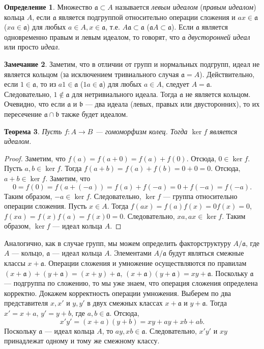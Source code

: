 \documentclass[12pt, titlepage, oneside]{amsbook}
\newcommand{\aaa}{\mathfrak{a}}
\newcommand{\bbb}{\mathfrak{b}}
\newtheorem{theorem}{Теорема}[chapter]
\theoremstyle{definition}
\newtheorem{definition}[theorem]{Определение}
\newtheorem{remark}[theorem]{Замечание}
\theoremstyle{remark}
\begin{document}
\begin{definition}
	Множество $\aaa\subset A$ называется \emph{левым идеалом} (\emph{правым идеалом}) кольца $A$, если $\aaa$ является подгруппой относительно операции сложения и $ax\in\aaa$ ($xa\in\aaa$) для любых $a\in A, x\in\aaa$, т.е. $A\aaa\subset\aaa$ ($\aaa A\subset\aaa$). Если $\aaa$ является одновременно правым и левым идеалом, то говорят, что $\aaa$ \emph{двусторонней идеал} или просто \emph{идеал}.
\end{definition}

\begin{remark}
	Заметим, что в отличии от групп и нормальных подгрупп, идеал не является кольцом (за исключением тривиального случая $\aaa=A$). Действительно, если $1\in\aaa$, то из $a1\in\aaa$ ($1a\in\aaa$) для любых $a\in A$, следует $A=\aaa$. Следовательно, $1\not\in\aaa$ для нетривиального идеала. Тогда $\aaa$ не является кольцом. Очевидно, что если $\aaa$ и $\bbb$ --- два идеала (левых, правых или двусторонних), то их пересечение $\aaa\cap\bbb$ также будет идеалом.
\end{remark}

\begin{theorem}
	\label{Kol2} Пусть $f\colon A\rightarrow B$ --- гомоморфизм колец. Тогда $\ker f$ является идеалом.
\end{theorem}

\begin{proof}
	Заметим, что $f(a)=f(a+0)=f(a)+f(0)$. Отсюда, $0\in\ker f$.
	Пусть $a,b\in\ker f$. Тогда $f(a+b)=f(a)+f(b)=0+0=0$. Отсюда, $a+b\in\ker f$. Заметим, что $$0=f(0)=f(a+(-a))=f(a)+f(-a)=0+f(-a)=f(-a).$$  Таким образом, $-a\in\ker f$. Следовательно, $\ker f$ --- группа относительно операции сложения. Пусть $x\in A$. Тогда $f(ax)=f(a)f(x)=0f(x)=0$, $f(xa)=f(x)f(a)=f(x)0=0$. Следовательно, $xa,ax\in\ker f$. Таким образом, $\ker f$ --- идеал кольца $A$.
\end{proof}

Аналогично, как в случае групп, мы можем определить факторструктуру $A/\aaa$, где $A$ --- кольцо, $\aaa$ --- идеал кольца $A$. Элементами $A/\aaa$ будут являться смежные классы $x+\aaa$. Операции сложения и умножение осуществляются по правилам $(x+\aaa)+(y+\aaa)=(x+y)+\aaa$, $(x+\aaa)(y+\aaa)=xy+\aaa$. Поскольку $\aaa$ --- подгруппа по сложению, то мы уже знаем, что операция сложения определена корректно. Докажем корректность операции умножения. Выберем по два представителя $x,x'$ и $y,y'$ в двух смежных классах $x+\aaa$ и $y+\aaa$. Тогда $x'=x+a$, $y'=y+b$, где $a,b\in\aaa$. Отсюда, $$x'y'=(x+a)(y+b)=xy+ay+xb+ab.$$ Поскольку $\aaa$ --- идеал кольца $A$, то $ay,xb\in\aaa$. Следовательно, $x'y'$ и $xy$ принадлежат одному и тому же смежному классу.
\end{document}
